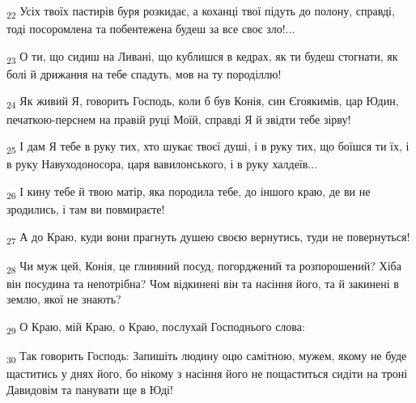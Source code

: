 \begin{tcolorbox}
\textsubscript{22} Усіх твоїх пастирів буря розкидає, а коханці твої підуть до полону, справді, тоді посоромлена та побентежена будеш за все своє зло!...
\end{tcolorbox}
\begin{tcolorbox}
\textsubscript{23} О ти, що сидиш на Ливані, що кублишся в кедрах, як ти будеш стогнати, як болі й дрижання на тебе спадуть, мов на ту породіллю!
\end{tcolorbox}
\begin{tcolorbox}
\textsubscript{24} Як живий Я, говорить Господь, коли б був Конія, син Єгоякимів, цар Юдин, печаткою-перснем на правій руці Моїй, справді Я й звідти тебе зірву!
\end{tcolorbox}
\begin{tcolorbox}
\textsubscript{25} І дам Я тебе в руку тих, хто шукає твоєї душі, і в руку тих, що боїшся ти їх, і в руку Навуходоносора, царя вавилонського, і в руку халдеїв...
\end{tcolorbox}
\begin{tcolorbox}
\textsubscript{26} І кину тебе й твою матір, яка породила тебе, до іншого краю, де ви не зродились, і там ви повмираєте!
\end{tcolorbox}
\begin{tcolorbox}
\textsubscript{27} А до Краю, куди вони прагнуть душею своєю вернутись, туди не повернуться!
\end{tcolorbox}
\begin{tcolorbox}
\textsubscript{28} Чи муж цей, Конія, це глиняний посуд, погорджений та розпорошений? Хіба він посудина та непотрібна? Чом відкинені він та насіння його, та й закинені в землю, якої не знають?
\end{tcolorbox}
\begin{tcolorbox}
\textsubscript{29} О Краю, мій Краю, о Краю, послухай Господнього слова:
\end{tcolorbox}
\begin{tcolorbox}
\textsubscript{30} Так говорить Господь: Запишіть людину оцю самітною, мужем, якому не буде щаститись у днях його, бо нікому з насіння його не пощаститься сидіти на троні Давидовім та панувати ще в Юді!
\end{tcolorbox}
